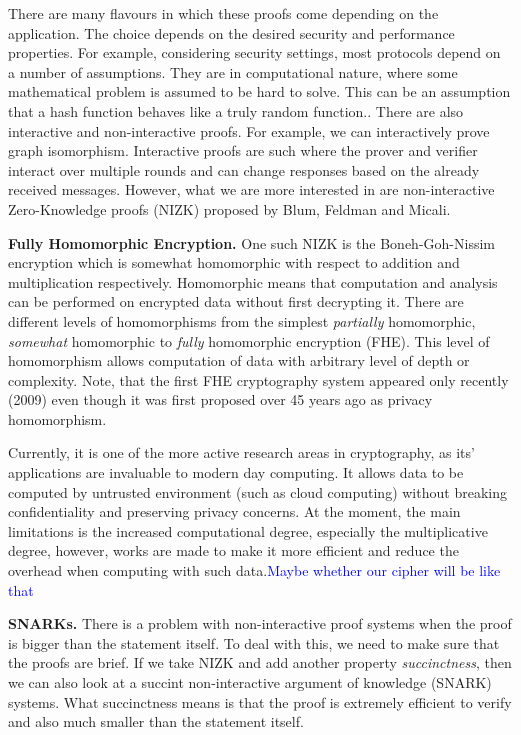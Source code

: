 \documentclass{Resources/UoBLab1}
\theoremstyle{definition}
\begin{document}
There are many flavours in which these proofs come depending on the application. The choice depends on the desired security and performance properties. For example, considering security settings, most protocols depend on a number of assumptions. They are in computational nature, where some mathematical problem is assumed to be hard to solve. This can be an assumption that a hash function behaves like a truly random function.\cite{RNGZK}. There are also interactive and non-interactive proofs. For example, we can interactively prove graph isomorphism\cite{ZKProofSystemsBook}. Interactive proofs are such where the prover and verifier interact over multiple rounds and can change responses based on the already received messages. However, what we are more interested in are non-interactive Zero-Knowledge proofs (NIZK) proposed by Blum, Feldman and Micali\cite{NIZK}.\medskip

\noindent\textbf{Fully Homomorphic Encryption.} One such NIZK is the Boneh-Goh-Nissim\cite{BGNCipher} encryption which is somewhat homomorphic with respect to addition and multiplication respectively. Homomorphic means that computation and analysis can be performed on encrypted data without first decrypting it. There are different levels of homomorphisms from the simplest \textit{partially} homomorphic, \textit{somewhat} homomorphic to \textit{fully} homomorphic encryption (FHE). This level of homomorphism allows computation of data with arbitrary level of depth or complexity\cite{FHEPHD}. Note, that the first FHE cryptography system appeared only recently (2009\cite{FHEPHD}) even though it was first proposed over 45 years ago\cite{FHEMention} as privacy homomorphism.

Currently, it is one of the more active research areas in cryptography, as its' applications are invaluable to modern day computing. It allows data to be computed by untrusted environment (such as cloud computing) without breaking confidentiality and preserving privacy concerns. At the moment, the main limitations is the increased computational degree, especially the multiplicative degree, however, works are made to make it more efficient and reduce the overhead when computing with such data\cite{FHEImprovement1}\cite{FHEImprovement2}.\textcolor{blue}{Maybe whether our cipher will be like that}\medskip

\noindent\textbf{SNARKs.} There is a problem with non-interactive proof systems when the proof is bigger than the statement itself. To deal with this, we need to make sure that the proofs are brief. If we take NIZK and add another property \textit{succinctness}, then we can also look at a succint non-interactive argument of knowledge (SNARK) systems. What succinctness means is that the proof is extremely efficient to verify and also much smaller than the statement itself.
\end{document}
